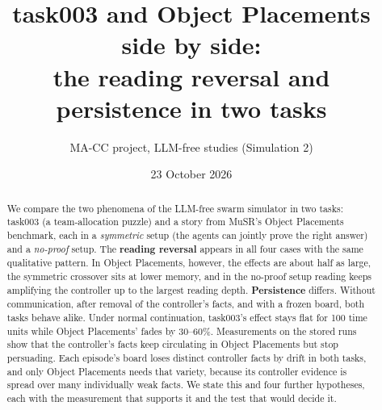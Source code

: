 \documentclass[10pt,a4paper]{article}
\title{\textbf{task003 and Object Placements side by side:}\\[2pt]
\textbf{the reading reversal and persistence in two tasks}}
\author{MA-CC project, LLM-free studies (Simulation 2)}
\date{23 October 2026}
\begin{document}
\maketitle

\begin{abstract}
\noindent
We compare the two phenomena of the LLM-free swarm simulator in two tasks: task003 (a team-allocation puzzle) and a
story from MuSR's Object Placements benchmark, each in a \emph{symmetric} setup (the agents can jointly prove the right
answer) and a \emph{no-proof} setup. The \textbf{reading reversal} appears in all four cases with the same qualitative
pattern. In Object Placements, however, the effects are about half as large, the symmetric crossover sits at lower memory,
and in the no-proof setup reading keeps amplifying the controller up to the largest reading depth.
\textbf{Persistence} differs. Without communication, after removal of the controller's facts, and with a frozen board,
both tasks behave alike. Under normal continuation, task003's effect stays flat for 100 time units while Object
Placements' fades by 30--60\%. Measurements on the stored runs show that the controller's facts keep circulating in Object
Placements but stop persuading. Each episode's board loses distinct controller facts by drift in both tasks, and only
Object Placements needs that variety, because its controller evidence is spread over many individually weak facts. We
state this and four further hypotheses, each with the measurement that supports it and the test that would decide it.
\end{abstract}
\end{document}
